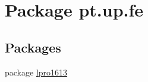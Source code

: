 \hypertarget{namespacept_1_1up_1_1fe}{}\section{Package pt.\+up.\+fe}
\label{namespacept_1_1up_1_1fe}
\subsection*{Packages}
\begin{DoxyCompactItemize}
\item 
package \hyperlink{namespacept_1_1up_1_1fe_1_1lpro1613}{lpro1613}
\end{DoxyCompactItemize}

